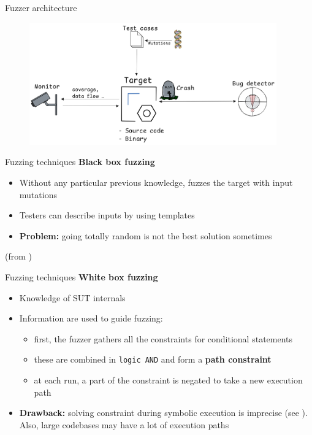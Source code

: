 \documentclass[xcolor=dvipsnames, 12pt]{beamer}
\begin{document}
\begin{frame}{Fuzzer architecture}
        \begin{figure}
                \begin{center}
                        \includegraphics[width=0.95\textwidth]{assets/fuzz_arch.png}
                \end{center}
        \end{figure}
        
\end{frame}

\begin{frame}{Fuzzing techniques}
        \textbf{Black box fuzzing}
        \begin{itemize}
                \item Without any particular previous knowledge, fuzzes the target with input mutations
                \item Testers can describe inputs by using templates
                \item \textbf{Problem:} going totally random is not the best solution sometimes
        \end{itemize}
        (from \cite{8371326})
        
\end{frame}

\begin{frame}{Fuzzing techniques}
        \textbf{White box fuzzing}
        \begin{itemize}
                \item Knowledge of SUT internals
                \item Information are used to guide fuzzing:
                        \begin{itemize}
                                \item first, the fuzzer gathers all the constraints for conditional statements
                                \item these are combined in \texttt{logic AND} and form a \textbf{path constraint}
                                \item at each run, a part of the constraint is negated to take a new execution path
                        \end{itemize}
                \item \textbf{Drawback:} solving constraint during symbolic execution is imprecise (see \cite{8371326}). Also, large codebases may have a lot of execution paths
        \end{itemize}
\end{frame}
\end{document}
